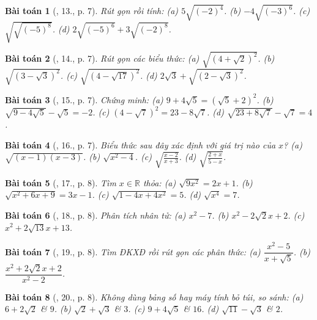 \documentclass{article}
\newtheorem{baitoan}{Bài toán}
\begin{document}
\begin{baitoan}[\cite{SBT_Toan_9_tap_1}, 13., p. 7]
	Rút gọn rồi tính: (a) $5\sqrt{(-2)^4}$. (b) $-4\sqrt{(-3)^6}$. (c) $\sqrt{\sqrt{(-5)^8}}$. (d) $2\sqrt{(-5)^6} + 3\sqrt{(-2)^8}$.
\end{baitoan}

\begin{baitoan}[\cite{SBT_Toan_9_tap_1}, 14., p. 7]
	Rút gọn các biểu thức: (a) $\sqrt{(4 + \sqrt{2})^2}$. (b) $\sqrt{(3 - \sqrt{3})^2}$. (c) $\sqrt{(4 - \sqrt{17})^2}$. (d) $2\sqrt{3} + \sqrt{(2 - \sqrt{3})^2}$.
\end{baitoan}

\begin{baitoan}[\cite{SBT_Toan_9_tap_1}, 15., p. 7]
	Chứng minh: (a) $9 + 4\sqrt{5} = (\sqrt{5} + 2)^2$. (b) $\sqrt{9 - 4\sqrt{5}} - \sqrt{5} = -2$. (c) $(4 - \sqrt{7})^2 = 23 - 8\sqrt{7}$. (d) $\sqrt{23 + 8\sqrt{7}} - \sqrt{7} = 4$.
\end{baitoan}

\begin{baitoan}[\cite{SBT_Toan_9_tap_1}, 16., p. 7]
	Biểu thức sau đây xác định với giá trị nào của $x$? (a) $\sqrt{(x - 1)(x - 3)}$. (b) $\sqrt{x^2 - 4}$. (c) $\sqrt{\frac{x - 2}{x + 3}}$. (d) $\sqrt{\frac{2 + x}{5 - x}}$.
\end{baitoan}

\begin{baitoan}[\cite{SBT_Toan_9_tap_1}, 17., p. 8]
	Tìm $x\in\mathbb{R}$ thỏa: (a) $\sqrt{9x^2} = 2x + 1$. (b) $\sqrt{x^2 + 6x + 9} = 3x - 1$. (c) $\sqrt{1 - 4x + 4x^2} = 5$. (d) $\sqrt{x^4} = 7$.
\end{baitoan}

\begin{baitoan}[\cite{SBT_Toan_9_tap_1}, 18., p. 8]
	Phân tích nhân tử: (a) $x^2 - 7$. (b) $x^2  - 2\sqrt{2}x + 2$. (c) $x^2 + 2\sqrt{13}x + 13$.
\end{baitoan}

\begin{baitoan}[\cite{SBT_Toan_9_tap_1}, 19., p. 8]
	Tìm ĐKXĐ rồi rút gọn các phân thức: (a) $\dfrac{x^2 - 5}{x + \sqrt{5}}$. (b) $\dfrac{x^2 + 2\sqrt{2}x + 2}{x^2 - 2}$.
\end{baitoan}

\begin{baitoan}[\cite{SBT_Toan_9_tap_1}, 20., p. 8]
	Không dùng bảng số hay máy tính bỏ túi, so sánh: (a) $6 + 2\sqrt{2}$ \& $9$. (b) $\sqrt{2} + \sqrt{3}$ \& $3$. (c) $9 + 4\sqrt{5}$ \& $16$. (d) $\sqrt{11} - \sqrt{3}$ \& $2$.
\end{baitoan}
\end{document}
